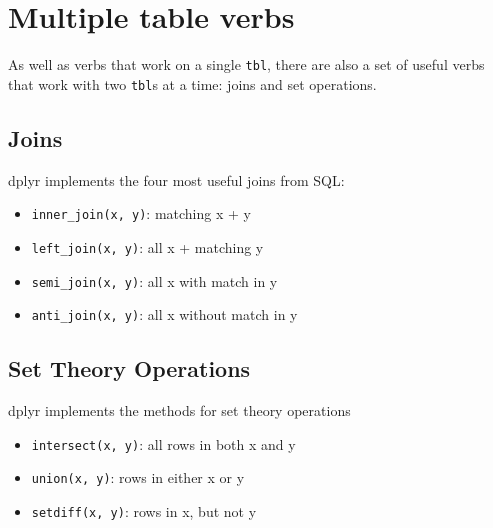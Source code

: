 \documentclass{article}
\begin{document}
\section{Multiple table verbs}

As well as verbs that work on a single \texttt{tbl}, there are also a set of useful verbs that work with two \texttt{tbl}s at a time: joins and set operations.

\subsection*{Joins}
dplyr implements the four most useful joins from SQL:

\begin{itemize}
\item \texttt{inner\_join(x, y)}: matching x + y
\item \texttt{left\_join(x, y)}: all x + matching y
\item \texttt{semi\_join(x, y)}: all x with match in y
\item \texttt{anti\_join(x, y)}: all x without match in y
\end{itemize}

\subsection*{Set Theory Operations}

dplyr implements the methods for set theory operations

\begin{itemize}
\item \texttt{intersect(x, y)}: all rows in both x and y
\item \texttt{union(x, y)}: rows in either x or y
\item \texttt{setdiff(x, y)}: rows in x, but not y
\end{itemize}
\end{document}
